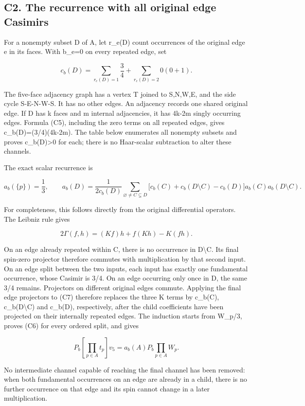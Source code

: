 \documentclass[11pt]{article}
\begin{document}
\subsection*{C2. The recurrence with all original edge Casimirs}

For a nonempty subset D of A, let r\_e(D) count occurrences of the original edge e in its faces. With b\_e=0 on every repeated edge, set

\[
 c_b(D)=\sum_{r_e(D)=1}\frac34+
 \sum_{r_e(D)=2}0(0+1). \tag{C5}
\]

The five-face adjacency graph has a vertex T joined to S,N,W,E, and the side cycle S-E-N-W-S. It has no other edges. An adjacency records one shared original edge. If D has k faces and m internal adjacencies, it has 4k-2m singly occurring edges. Formula (C5), including the zero terms on all repeated edges, gives c\_b(D)=(3/4)(4k-2m). The table below enumerates all nonempty subsets and proves c\_b(D)>0 for each; there is no Haar-scalar subtraction to alter these channels.

The exact scalar recurrence is

\[
 a_b(\{p\})=\frac13,\qquad
 a_b(D)=\frac1{2c_b(D)}\sum_{\varnothing\ne C\subsetneq D}
 \bigl[c_b(C)+c_b(D\setminus C)-c_b(D)\bigr]
 a_b(C)a_b(D\setminus C). \tag{C6}
\]

For completeness, this follows directly from the original differential operators. The Leibniz rule gives

\[
 2\Gamma(f,h)=(Kf)h+f(Kh)-K(fh). \tag{C7}
\]

On an edge already repeated within C, there is no occurrence in D\textbackslash{}C. Its final spin-zero projector therefore commutes with multiplication by that second input. On an edge split between the two inputs, each input has exactly one fundamental occurrence, whose Casimir is 3/4. On an edge occurring only once in D, the same 3/4 remains. Projectors on different original edges commute. Applying the final edge projectors to (C7) therefore replaces the three K terms by c\_b(C), c\_b(D\textbackslash{}C) and c\_b(D), respectively, after the child coefficients have been projected on their internally repeated edges. The induction starts from W\_p/3, proves (C6) for every ordered split, and gives

\[
 P_b[\prod_{p\in A}t_p]v_5
 =a_b(A)P_b\prod_{p\in A}W_p. \tag{C8}
\]

No intermediate channel capable of reaching the final channel has been removed: when both fundamental occurrences on an edge are already in a child, there is no further occurrence on that edge and its spin cannot change in a later multiplication.
\end{document}

